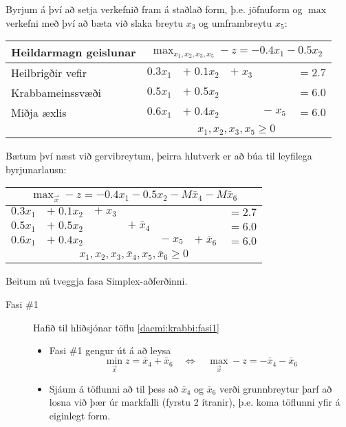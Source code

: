 \begin{lausn}Byrjum á því að setja verkefnið fram á staðlað form, þ.e. jöfnuform og $\max$ verkefni með því að bæta við slaka breytu $x_3$ og umframbreytu $x_5$:
\begin{center}{\renewcommand{\arraystretch}{1.5} \renewcommand{\tabcolsep}{0.2cm}
\begin{tabular}{|l|rrrrr|}\hline
Heildarmagn geislunar & \multicolumn{5}{c|}{$\max_{x_1,x_2,x_3,x_5}  -z = -0.4x_1 - 0.5x_2$} \\ \hline
Heilbrigðir vefir & $0.3x_1$ & $+\; 0.1x_2$ & $+\; x_3$ & & $ =  2.7 $ \\
Krabbameinssvæði & $ 0.5x_1 $&$ +\; 0.5x_2 $&&&$=  6.0 $ \\
Miðja æxlis & $0.6x_1$&$ +\; 0.4x_2$&&$ -\; x_5$ &$= 6.0$ \\ 
& \multicolumn{5}{c|}{$x_1,x_2,x_3,x_5 \ge 0$} \\ \hline
\end{tabular}}
\end{center}
Bætum því næst við gervibreytum, þeirra hlutverk er að búa til leyfilega byrjunarlausn:
\begin{center}{\renewcommand{\arraystretch}{1.5} \renewcommand{\tabcolsep}{0.2cm}
\begin{tabular}{|rrrrrrr|}\hline
\multicolumn{7}{|c|}{$\max_{\vec{x}}  -z = -0.4x_1 - 0.5x_2 -M \bar{x}_4  -M \bar{x}_6$} \\ \hline
$0.3x_1$ & $+\; 0.1x_2$ & $+\; x_3$ & & & & $ =  2.7 $ \\
$ 0.5x_1 $&$ +\; 0.5x_2 $&&$+\;\bar{x}_4$&&&$=  6.0 $ \\
$0.6x_1$&$ +\; 0.4x_2$&&&$ -\; x_5$ &$+\;\bar{x}_6$&$= 6.0$ \\ 
\multicolumn{7}{|c|}{$x_1,x_2,x_3,\bar{x}_4,x_5,\bar{x}_6 \ge 0$} \\ \hline
\end{tabular}}
\end{center}
\newpage
Beitum nú tveggja fasa Simplex-aðferðinni.
\begin{description}
 \item[Fasi \#1] Hafið til hliðsjónar töflu \ref{daemi:krabbi:fasi1}
\begin{itemize}
 \item Fasi \#1 gengur út á að leysa
$$\min_{\vec{x}} z=\bar{x}_4+\bar{x}_6 \quad \Leftrightarrow \quad \max_{\vec{x}} -z=-\bar{x}_4-\bar{x}_6$$
 \item Sjáum á töflunni að til þess að $\bar{x}_4$ og $\bar{x}_6$ verði grunnbreytur þarf að losna við þær úr markfalli (fyrstu 2 ítranir), þ.e. koma töflunni yfir á eiginlegt form.

\end{itemize}
\end{description}
\end{lausn}
